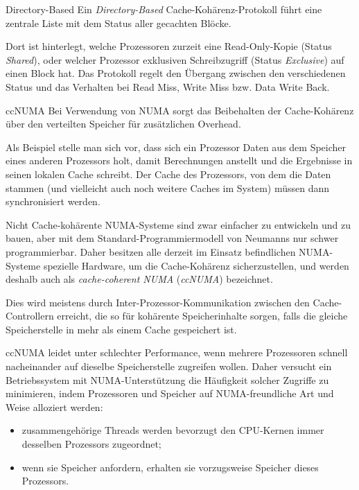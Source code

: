 \begin{defi}{Directory-Based}
    Ein \emph{Directory-Based} Cache-Kohärenz-Protokoll führt eine zentrale Liste mit dem Status aller gecachten Blöcke.

    Dort ist hinterlegt, welche Prozessoren zurzeit eine Read-Only-Kopie (Status \emph{Shared}), oder welcher Prozessor exklusiven Schreibzugriff (Status \emph{Exclusive}) auf einen Block hat.
    Das Protokoll regelt den Übergang zwischen den verschiedenen Status und das Verhalten bei Read Miss, Write Miss bzw. Data Write Back.
\end{defi}


\begin{example}{ccNUMA}
    Bei Verwendung von NUMA sorgt das Beibehalten der Cache-Kohärenz über den verteilten Speicher für zusätzlichen Overhead.

    Als Beispiel stelle man sich vor, dass sich ein Prozessor Daten aus dem Speicher eines anderen Prozessors holt, damit Berechnungen anstellt und die Ergebnisse in seinen lokalen Cache schreibt.
    Der Cache des Prozessors, von dem die Daten stammen (und vielleicht auch noch weitere Caches im System) müssen dann synchronisiert werden.

    Nicht Cache-kohärente NUMA-Systeme sind zwar einfacher zu entwickeln und zu bauen, aber mit dem Standard-Programmiermodell von Neumanns nur schwer programmierbar.
    Daher besitzen alle derzeit im Einsatz befindlichen NUMA-Systeme spezielle Hardware, um die Cache-Kohärenz sicherzustellen, und werden deshalb auch als \emph{cache-coherent NUMA} (\emph{ccNUMA}) bezeichnet.

    Dies wird meistens durch Inter-Prozessor-Kommunikation zwischen den Cache-Controllern erreicht, die so für kohärente Speicherinhalte sorgen, falls die gleiche Speicherstelle in mehr als einem Cache gespeichert ist.

    ccNUMA leidet unter schlechter Performance, wenn mehrere Prozessoren schnell nacheinander auf dieselbe Speicherstelle zugreifen wollen.
    Daher versucht ein Betriebssystem mit NUMA-Unterstützung die Häufigkeit solcher Zugriffe zu minimieren, indem Prozessoren und Speicher auf NUMA-freundliche Art und Weise alloziert werden:
    \begin{itemize}
        \item zusammengehörige Threads werden bevorzugt den CPU-Kernen immer desselben Prozessors zugeordnet;
        \item wenn sie Speicher anfordern, erhalten sie vorzugsweise Speicher dieses Prozessors.
    \end{itemize}
\end{example}

